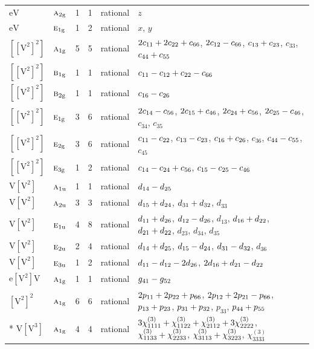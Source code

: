 \documentclass[10pt,a4paper]{article}
\numberwithin{equation}{section}
\newcommand{\irr}[1]{\text{\normalfont\scshape #1}}
\newcommand{\ptag}[1]{\mathrm{#1}}
\newcommand{\jahn}[1]{\mathrm{#1}}
\newlength{\fillwidth}\newlength{\cellwidth}\newlength{\colwidth}
\newcommand{\signbreak}{\penalty100\relax}
\begin{document}
{\begin{longtable}{@{}llrrl>{\RaggedRight\arraybackslash}p{\fillwidth}@{}}
$\jahn{eV}$ & $\irr{a}_{2\ptag{g}}$ & 1 & 1 & rational & $z$\\
$\jahn{eV}$ & $\irr{e}_{1\ptag{g}}$ & 1 & 2 & rational & $x$, $y$\\
$\jahn{[[V^{2}]^{2}]}$ & $\irr{a}_{1\ptag{g}}$ & 5 & 5 & rational & $2c_{11} +\signbreak 2c_{22} +\signbreak c_{66}$, $2c_{12} -\signbreak c_{66}$, $c_{13} +\signbreak c_{23}$, $c_{33}$, $c_{44} +\signbreak c_{55}$\\
$\jahn{[[V^{2}]^{2}]}$ & $\irr{b}_{1\ptag{g}}$ & 1 & 1 & rational & $c_{11} -\signbreak c_{12} +\signbreak c_{22} -\signbreak c_{66}$\\
$\jahn{[[V^{2}]^{2}]}$ & $\irr{b}_{2\ptag{g}}$ & 1 & 1 & rational & $c_{16} -\signbreak c_{26}$\\
$\jahn{[[V^{2}]^{2}]}$ & $\irr{e}_{1\ptag{g}}$ & 3 & 6 & rational & $2c_{14} -\signbreak c_{56}$, $2c_{15} +\signbreak c_{46}$, $2c_{24} +\signbreak c_{56}$, $2c_{25} -\signbreak c_{46}$, $c_{34}$, $c_{35}$\\
$\jahn{[[V^{2}]^{2}]}$ & $\irr{e}_{2\ptag{g}}$ & 3 & 6 & rational & $c_{11} -\signbreak c_{22}$, $c_{13} -\signbreak c_{23}$, $c_{16} +\signbreak c_{26}$, $c_{36}$, $c_{44} -\signbreak c_{55}$, $c_{45}$\\
$\jahn{[[V^{2}]^{2}]}$ & $\irr{e}_{3\ptag{g}}$ & 1 & 2 & rational & $c_{14} -\signbreak c_{24} +\signbreak c_{56}$, $c_{15} -\signbreak c_{25} -\signbreak c_{46}$\\
$\jahn{V[V^{2}]}$ & $\irr{a}_{1\ptag{u}}$ & 1 & 1 & rational & $d_{14} -\signbreak d_{25}$\\
$\jahn{V[V^{2}]}$ & $\irr{a}_{2\ptag{u}}$ & 3 & 3 & rational & $d_{15} +\signbreak d_{24}$, $d_{31} +\signbreak d_{32}$, $d_{33}$\\
$\jahn{V[V^{2}]}$ & $\irr{e}_{1\ptag{u}}$ & 4 & 8 & rational & $d_{11} +\signbreak d_{26}$, $d_{12} -\signbreak d_{26}$, $d_{13}$, $d_{16} +\signbreak d_{22}$, $d_{21} +\signbreak d_{22}$, $d_{23}$, $d_{34}$, $d_{35}$\\
$\jahn{V[V^{2}]}$ & $\irr{e}_{2\ptag{u}}$ & 2 & 4 & rational & $d_{14} +\signbreak d_{25}$, $d_{15} -\signbreak d_{24}$, $d_{31} -\signbreak d_{32}$, $d_{36}$\\
$\jahn{V[V^{2}]}$ & $\irr{e}_{3\ptag{u}}$ & 1 & 2 & rational & $d_{11} -\signbreak d_{12} -\signbreak 2d_{26}$, $2d_{16} +\signbreak d_{21} -\signbreak d_{22}$\\
$\jahn{e[V^{2}]V}$ & $\irr{a}_{1\ptag{g}}$ & 1 & 1 & rational & $\mathnormal{g}_{41} -\signbreak \mathnormal{g}_{52}$\\
$\jahn{[V^{2}]^{2}}$ & $\irr{a}_{1\ptag{g}}$ & 6 & 6 & rational & $2p_{11} +\signbreak 2p_{22} +\signbreak p_{66}$, $2p_{12} +\signbreak 2p_{21} -\signbreak p_{66}$, $p_{13} +\signbreak p_{23}$, $p_{31} +\signbreak p_{32}$, $p_{33}$, $p_{44} +\signbreak p_{55}$\\*
$\jahn{V[V^{3}]}$ & $\irr{a}_{1\ptag{g}}$ & 4 & 4 & rational & $3\chi^{(3)}_{1111} +\signbreak \chi^{(3)}_{1122} +\signbreak \chi^{(3)}_{2112} +\signbreak 3\chi^{(3)}_{2222}$, $\chi^{(3)}_{1133} +\signbreak \chi^{(3)}_{2233}$, $\chi^{(3)}_{3113} +\signbreak \chi^{(3)}_{3223}$, $\chi^{(3)}_{3333}$\\
\bottomrule\end{longtable}}
\end{document}

